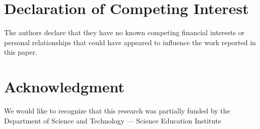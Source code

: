 \documentclass[preprint,12pt,authoryear]{elsarticle}
\begin{document}
\section{Declaration of Competing Interest}
The authors declare that they have no known competing financial interests or
personal relationships that could have appeared to influence the work reported
in this paper.

\section{Acknowledgment}
We would like to recognize that this research was partially funded by the
Department of Science and Technology --- Science Education Institute




\newpage
\end{document}
